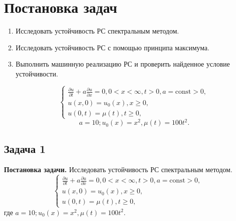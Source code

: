 \documentclass[11pt]{article}
\begin{document}
    \section*{Постановка
задач}\label{ux43fux43eux441ux442ux430ux43dux43eux432ux43aux430-ux437ux430ux434ux430ux447}
\begin{enumerate}
    \item Исследовать устойчивость РС спектральным методом.
    \item Исследовать устойчивость РС с помощью принципа максимума.
    \item Выполнить машинную реализацию РС и проверить найденное условие устойчивости.

    $$\begin{cases}
        \frac{\partial u}{\partial t}+a\frac{\partial u}{\partial x}=0, 0<x<\infty, t>0, a=\text{const}>0,\\
        u(x,0)=u_0(x), x\geq 0,\\
        u(0,t)=\mu(t), t\geq 0,
    \end{cases}$$
    $$a=10;u_0(x)=x^2,\mu(t)=100t^2.$$
\end{enumerate}

\newpage

\subsection*{Задача 1}
\textbf{Постановка задачи.} Исследовать устойчивость РС спектральным методом.
    $$\begin{cases}
        \frac{\partial u}{\partial t}+a\frac{\partial u}{\partial x}=0, 0<x<\infty, t>0, a=\text{const}>0,\\
        u(x,0)=u_0(x), x\geq 0,\\
        u(0,t)=\mu(t), t\geq 0,
    \end{cases}$$
    где $a=10;u_0(x)=x^2,\mu(t)=100t^2.$
    
\end{document}
